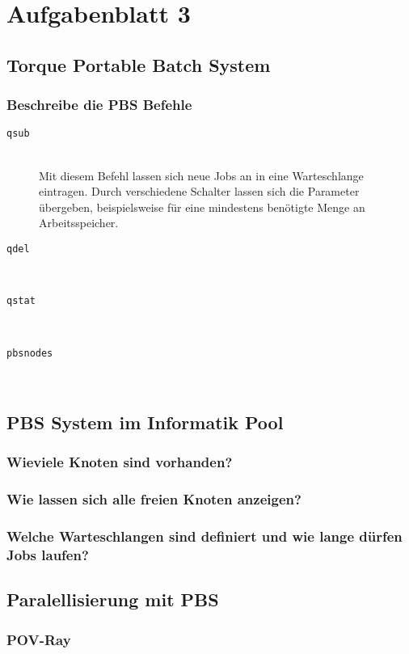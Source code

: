 \section{Aufgabenblatt 3}

\subsection{Torque Portable Batch System}
\subsubsection{Beschreibe die PBS Befehle}

\begin{description}
	\item[\texttt{qsub}] \hfill \\
		Mit diesem Befehl lassen sich neue Jobs an in eine Warteschlange eintragen.
		Durch verschiedene Schalter lassen sich die Parameter \"ubergeben,
		beispielsweise für eine mindestens benötigte Menge an Arbeitsspeicher.

	\item[\texttt{qdel}] \hfill \\
	\item[\texttt{qstat}] \hfill \\
	\item[\texttt{pbsnodes}] \hfill \\
\end{description}


\subsection{PBS System im Informatik Pool}
\subsubsection{Wieviele Knoten sind vorhanden?}
\subsubsection{Wie lassen sich alle freien Knoten anzeigen?}
\subsubsection{Welche Warteschlangen sind definiert und wie lange d\"urfen Jobs laufen?}


\subsection{Paralellisierung mit PBS}

\subsubsection{POV-Ray}
